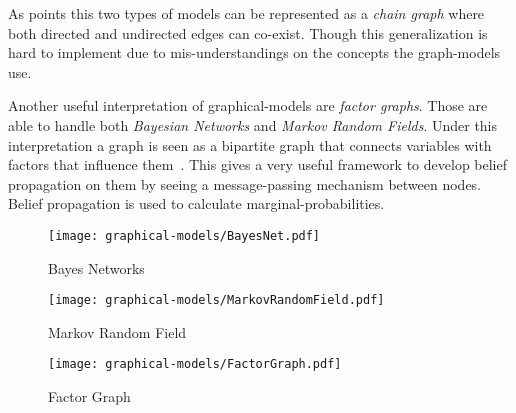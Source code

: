 As \cite{lauritzen2002chain} points this two types of models can be represented as a \emph{chain graph} where both directed and undirected edges can co-exist.
Though this generalization is hard to implement due to mis-understandings on the concepts the graph-models use.

Another useful interpretation of graphical-models are \emph{factor graphs}. Those are able to handle both \emph{Bayesian Networks} and \emph{Markov Random Fields}. Under this interpretation a graph is seen as a bipartite graph that connects variables with factors that influence them~\citep{bishop2006pattern}.
This gives a very useful framework to develop belief propagation on them by seeing a message-passing mechanism between nodes. Belief propagation is used to calculate marginal-probabilities.

\begin{figure}[ht]
    \begin{minipage}[b]{0.3\linewidth}
        \centering
        \texttt{[image: graphical-models/BayesNet.pdf]}
        \caption{Bayes Networks}
    \end{minipage}
    \hspace{0.5cm}
    \begin{minipage}[b]{0.3\linewidth}
        \centering
        \texttt{[image: graphical-models/MarkovRandomField.pdf]}
        \caption{Markov Random Field}
    \end{minipage}
    \hspace{0.5cm}
    \begin{minipage}[b]{0.3\linewidth}
        \centering
        \texttt{[image: graphical-models/FactorGraph.pdf]}
        \caption{Factor Graph}
    \end{minipage}
\end{figure}
